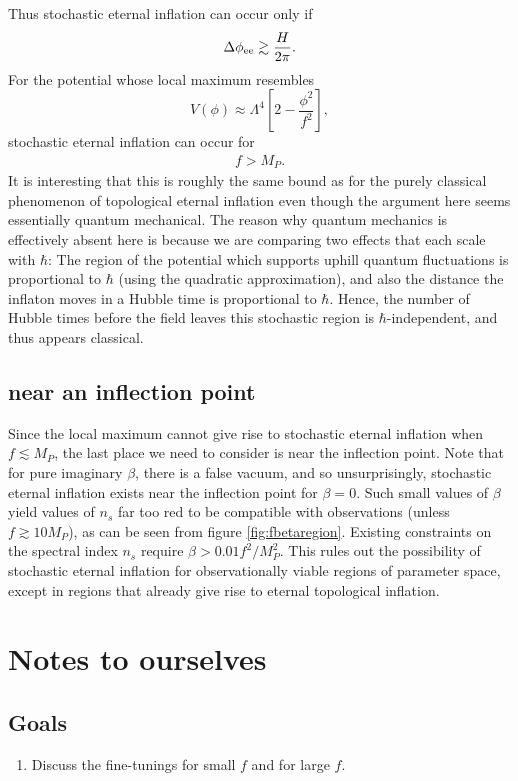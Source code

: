 \documentclass[aps,amsfonts,amsmath,prd,preprint,nofootinbib,superscriptaddress]{revtex4}
\newcommand{\Mp}{{M_{P}}}
\newcommand{\MMp}{{M_P^2}}
\newcommand{\beq}{\begin{equation}}
\newcommand{\eeq}{\end{equation}}
\begin{document}
\begin{appendix}
Thus stochastic eternal inflation can occur only if
\begin{align}
\Delta\phi_{\rm ee} \gtrsim \frac{H}{2\pi}.
\end{align}
For the potential whose local maximum resembles
\beq
V(\phi) \approx \Lambda^4\left[2 - \frac{\phi^2}{f^2}\right], \label{eq:Vp2}
\eeq
stochastic eternal inflation can occur for
\begin{align}
f > \Mp.
\end{align}
It is interesting that this is roughly the same bound as for the purely classical phenomenon of topological eternal inflation even though the argument here seems essentially quantum mechanical.  The reason
why quantum mechanics is effectively absent here is because we are comparing two effects that each scale with $\hbar$:  The region of the potential which supports uphill quantum fluctuations is proportional to $\hbar$ (using the quadratic approximation), and also the distance the inflaton moves in a Hubble time is proportional to $\hbar$.  Hence, the number of Hubble times before the field leaves this stochastic region is $\hbar$-independent, and thus appears classical.


\subsection{near an inflection point}
Since the local maximum cannot give rise to stochastic eternal inflation when $f \lesssim \Mp$, the last place we need to consider is near the inflection point. 
Note that for pure imaginary $\beta$, there is a false vacuum, and so unsurprisingly, stochastic eternal inflation exists near the inflection point for $\beta = 0$.  Such small
values of $\beta$ yield values of $n_s$ far too red to be compatible with observations (unless $f \gtrsim 10 \Mp$), as can be seen from figure \ref{fig:fbetaregion}. 
Existing constraints on the spectral index $n_s$ require $\beta > 0.01 f^2/\MMp$.  This rules out the possibility of stochastic eternal inflation for observationally viable regions of
parameter space, except in regions that already give rise to eternal topological inflation.



\section{Notes to ourselves}
\subsection{Goals}
\begin{enumerate}
\item Discuss the fine-tunings for small $f$ and for large $f$.  


\end{enumerate}
\end{appendix}
\end{document}
